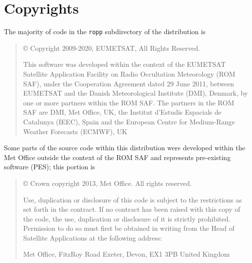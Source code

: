 
\chapter{Copyrights}\label{chap:copyrights}

The majority of code in the \texttt{ropp} subdirectory of the
distribution is
%
\begin{quote}
   \copyright{} Copyright 2009-2020, EUMETSAT, All Rights Reserved.

   This software was developed within the context of the EUMETSAT Satellite
   Application Facility on Radio Occultation Meteorology (ROM SAF), under the 
   Cooperation Agreement dated 29 June 2011, between EUMETSAT and the Danish
   Meteorological Institute (DMI), Denmark, by one or more partners within
   the ROM SAF. The partners in the ROM SAF are DMI, Met Office, UK, the
   Institut d'Estudis Espacials de Catalunya (IEEC), Spain and the European
   Centre for Medium-Range Weather Forecasts (ECMWF), UK
\end{quote}
%

Some parts of the source code within this distribution were developed
within the Met Office outside the context of the ROM SAF and represents
pre-existing software (PES); this portion is

\begin{quote}
   \copyright{} Crown copyright 2013, Met Office. All rights reserved.

   Use, duplication or disclosure of this code is subject to the restrictions
   as set forth in the contract. If no contract has been raised with this
   copy of the code, the use, duplication or disclosure of it is strictly
   prohibited. Permission to do so must first be obtained in writing from
   the Head of Satellite Applications at the following address:

                  Met Office, FitzRoy Road
                  Exeter, Devon, EX1 3PB
                  United Kingdom
\end{quote}
%

